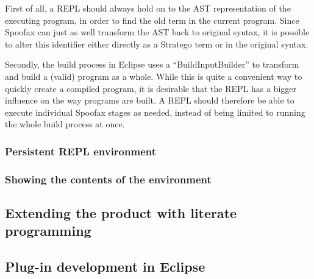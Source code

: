 First of all, a REPL should always hold on to the AST representation of the
executing program, in order to find the old term in the current program.
Since Spoofax can just as well transform the AST back to original syntax,
it is possible to alter this identifier either directly as a Stratego term or
in the original syntax.

Secondly, the build process in Eclipse uses a ``BuildInputBuilder'' to
transform and build a (valid) program as a whole. While this is quite
a convenient way to quickly create a compiled program, it is desirable
that the REPL has a bigger influence on the way programs are built. A
REPL should therefore be able to execute individual Spoofax stages as
needed, instead of being limited to running the whole build process at
once.

\subsubsection{Persistent REPL environment}
\label{sec:pers-repl-envir}

\subsubsection{Showing the contents of the environment}
\label{sec:show-cont-envir}

\subsection{Extending the product with literate programming}
\label{sec:extend-prod-with}

\subsection{Plug-in development in Eclipse}
\label{ssec:eclipse-plugins}

